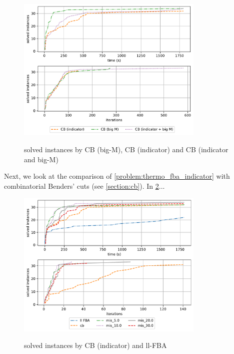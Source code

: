 \begin{figure}[h!]
    \caption{solved instances by CB (big-M), CB (indicator) and CB (indicator and big-M)}
    \centering
    \includegraphics[width=0.8\textwidth]{Images/comparison_solved_instances_indicator_and_big_m.pdf}
    \label{fig:comparison_solved_instances_indicator_and_big_m_as_MP}
\end{figure}

\newpage
Next, we look at the comparison of \cref{problem:thermo_fba_indicator} with combinatorial Benders' cuts (see \cref{section:cb}). 
In \cref{fig:mis_comparison_solved_instances}...

\begin{figure}[h!]
    \caption{solved instances by CB (indicator) and ll-FBA}
    \centering
    \includegraphics[width=0.8\textwidth]{Images/mis_comparison_solved_instances.pdf}
    \label{fig:mis_comparison_solved_instances}
\end{figure}


